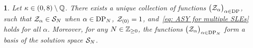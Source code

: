 \documentclass[oneside,english]{amsart}
\numberwithin{equation}{section}
\numberwithin{figure}{section}
\theoremstyle{plain}
\theoremstyle{plain}
\theoremstyle{plain}
\theoremstyle{remark}
\theoremstyle{plain}
\newtheorem{prop}[lem]{\protect\propositionname}
\theoremstyle{plain}
\theoremstyle{plain}
\theoremstyle{plain}
\theoremstyle{plain}
\theoremstyle{plain}
\theoremstyle{plain}
\theoremstyle{plain}
\providecommand{\propositionname}{Proposition}
\newcommand{\alexmod}[1]{{\color{allucol} #1}}
\begin{document}
\begin{prop}
\label{prop: solution space with power law bound}
Let $\kappa \in (0,8) \setminus \mathbb{Q}$.
There exists a unique collection of functions $\big(\mathcal{Z}_\alpha\big)_{\alpha \in \mathrm{DP}}$,
such that $\mathcal{Z}_\alpha \in \mathcal{S}_N$ when $\alpha \in \mathrm{DP}_N$, $\mathcal{Z}_{(0)} = 1$,
and~\eqref{eq: ASY for multiple SLEs} holds for all $\alpha$.
Moreover, for any $N \in \mathbb{Z}_{\geq 0}$, the functions $\big( \mathcal{Z}_\alpha \big)_{\alpha \in \mathrm{DP}_N}$
form a basis of the %
solution space $\mathcal{S}_N$.
\end{prop}
\end{document}
